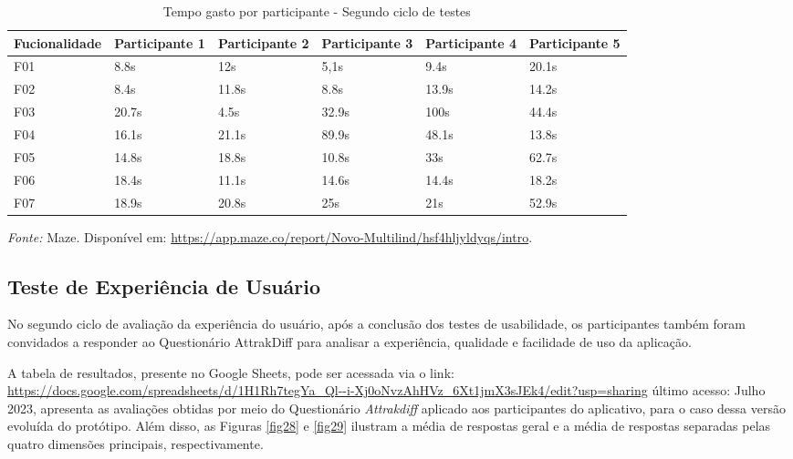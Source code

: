 \begin{table}[h!]
	\centering
	\caption{Tempo gasto por participante - Segundo ciclo de testes}
	\label{tab07}
	\begin{adjustbox}{center}
	\begin{tabular}{l|l|l|l|l|l}
	\hline
	Fucionalidade & Participante 1 & Participante 2 & Participante 3 & Participante 4 & Participante 5 \\ 	\hline
	F01                   & 8.8s     & 12s     & 5,1s      & 9.4s       & 20.1s      \\
	F02                   & 8.4s        & 11.8s      & 8.8s      & 13.9s    & 14.2s     \\
	F03                   & 20.7s        & 4.5s      & 32.9s      & 100s     & 44.4s     \\
	F04                   & 16.1s        & 21.1s     & 89.9s     & 48.1s     & 13.8s     \\
	F05                   & 14.8s      & 18.8s      & 10.8s     & 33s     & 62.7s     \\
	F06                   & 18.4s     & 11.1s      & 14.6s     & 14.4s     & 18.2s     \\
	F07                   & 18.9s     & 20.8s      & 25s     & 21s    & 52.9s       \\ 	\hline
	\end{tabular}
	\end{adjustbox}
	\begin{tablenotes}[flushleft]
		\centering
		\item \textit{Fonte:} Maze. Disponível em: \url{https://app.maze.co/report/Novo-Multilind/hsf4hljyldyqs/intro}.
	  \end{tablenotes}
\end{table}

\subsection{Teste de Experiência de Usuário}
\label{sec:Segundo Teste de Experiência de Usuário}
No segundo ciclo de avaliação da experiência do usuário, após a conclusão dos testes de usabilidade, os participantes também foram convidados a responder ao Questionário AttrakDiff para analisar a experiência, qualidade e facilidade de uso da aplicação.

A tabela de resultados, presente no Google Sheets, pode ser acessada via o link: 
\url{https://docs.google.com/spreadsheets/d/1H1Rh7tegYa_Ql--i-Xj0oNvzAhHVz_6Xt1jmX3sJEk4/edit?usp=sharing} último acesso: Julho 2023, apresenta as avaliações obtidas por meio do Questionário \textit{Attrakdiff} aplicado aos participantes do aplicativo, para o caso 
dessa versão evoluída do protótipo. Além disso, as Figuras \ref{fig28} e \ref{fig29} ilustram a média de respostas geral e a média de respostas separadas pelas quatro dimensões principais, respectivamente.

